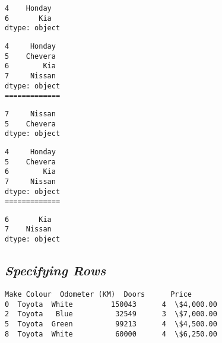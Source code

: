 \documentclass[11pt]{article}
\begin{document}
            \begin{tcolorbox}[breakable, size=fbox, boxrule=.5pt, pad at break*=1mm, opacityfill=0]
\begin{Verbatim}[commandchars=\\\{\}]
4    Honday
6       Kia
dtype: object
\end{Verbatim}
\end{tcolorbox}
        
    \begin{Verbatim}[commandchars=\\\{\}]
4     Honday
5    Chevera
6        Kia
7     Nissan
dtype: object
=============
    \end{Verbatim}

            \begin{tcolorbox}[breakable, size=fbox, boxrule=.5pt, pad at break*=1mm, opacityfill=0]
\begin{Verbatim}[commandchars=\\\{\}]
7     Nissan
5    Chevera
dtype: object
\end{Verbatim}
\end{tcolorbox}
        
    \begin{Verbatim}[commandchars=\\\{\}]
4     Honday
5    Chevera
6        Kia
7     Nissan
dtype: object
=============
    \end{Verbatim}

            \begin{tcolorbox}[breakable, size=fbox, boxrule=.5pt, pad at break*=1mm, opacityfill=0]
\begin{Verbatim}[commandchars=\\\{\}]
6       Kia
7    Nissan
dtype: object
\end{Verbatim}
\end{tcolorbox}
        
    \hypertarget{specifying-rows}{%
\subsection{\texorpdfstring{\textbf{\emph{Specifying
Rows}}}{Specifying Rows}}\label{specifying-rows}}

            \begin{tcolorbox}[breakable, size=fbox, boxrule=.5pt, pad at break*=1mm, opacityfill=0]
\begin{Verbatim}[commandchars=\\\{\}]
     Make Colour  Odometer (KM)  Doors      Price
0  Toyota  White         150043      4  \$4,000.00
2  Toyota   Blue          32549      3  \$7,000.00
5  Toyota  Green          99213      4  \$4,500.00
8  Toyota  White          60000      4  \$6,250.00
\end{Verbatim}
\end{tcolorbox}
        
\end{document}
